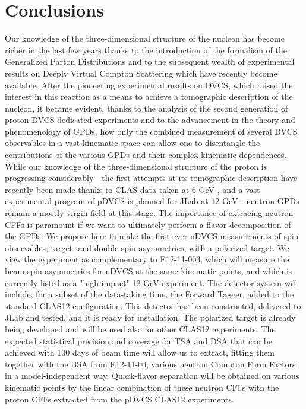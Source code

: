 
\section{Conclusions}
Our knowledge of the three-dimensional structure of the nucleon has become richer in the last few years thanks to the introduction of the formalism of the Generalized Parton Distributions and to the subsequent wealth of experimental results on Deeply Virtual Compton Scattering which have recently become available. After the pioneering experimental results on DVCS, which raised the interest in this reaction as a means to achieve a tomographic description of the nucleon, it became evident, thanks to the analysis of the second generation of proton-DVCS dedicated experiments and to the advancement in the theory and phenomenology of GPDs, how only the combined measurement of several DVCS observables in a vast kinematic space can allow one to disentangle the contributions of the various GPDs and their complex kinematic dependences. While our knowledge of the three-dimensional structure of the proton is progressing considerably - the first attempts at its tomographic description have recently been made thanks to CLAS data taken at 6 GeV \cite{pisano,hs}, and a vast experimental program of pDVCS is planned for JLab at 12 GeV - neutron GPDs remain a mostly virgin field at this stage. The importance of extracing neutron CFFs is paramount if we want to ultimately perform a flavor decomposition of the GPDs. 
We propose here to make the first ever nDVCS measurements of spin observables, target- and double-spin asymmetries, with a polarized target.  We view the experiment as complementary to E12-11-003, which will measure the beam-spin asymmetries for nDVCS at the same kinematic points, and which is currently listed as a "high-impact" 12 GeV experiment. 
The detector system will include, for a subset of the data-taking time, the Forward Tagger, added to the standard CLAS12 configuration. This detector has been constructed, delivered to JLab and tested, and it is ready for installation. The polarized target is already being developed and will be used also for other CLAS12 experiments. The expected statistical precision and coverage for TSA and DSA that can be achieved with 100 days of beam time will allow us to extract, fitting them together with the BSA from E12-11-00, various neutron Compton Form Factors in a model-independent way. Quark-flavor separation will be obtained on various kinematic points by the linear combination of these neutron CFFs with the proton CFFs extracted from the pDVCS CLAS12 experiments. 
